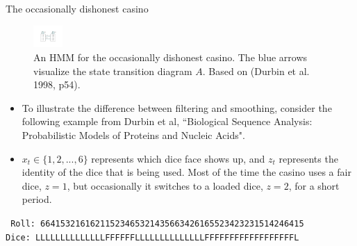 \documentclass[10pt,mathserif]{beamer}
\begin{document}
\begin{frame}{The occasionally dishonest casino}
\begin{figure}[h]
\centering
\includegraphics[width=0.1\textwidth]{casino}
\caption{An HMM for the occasionally dishonest casino. The blue arrows visualize the state transition diagram $A$. Based on (Durbin et al. 1998, p54).}
\end{figure}

\begin{itemize}
    \item To illustrate the difference between filtering and smoothing, consider the following example from Durbin et al, ``Biological Sequence Analysis: Probabilistic Models of Proteins and Nucleic Acids".
    \item $x_t\in \{1,2,...,6\}$ represents which dice face shows up, and $z_t$ represents the identity of the dice that is being used. Most of the time the casino uses a fair dice, $z = 1$, but occasionally it switches to a loaded dice, $z = 2$, for a short period.
\end{itemize}
\texttt{
Roll: 66415321616211523465321435663426165523423231514246415\\
Dice: LLLLLLLLLLLLLLFFFFFFLLLLLLLLLLLLLLFFFFFFFFFFFFFFFFFFL}
\end{frame}
\end{document}
